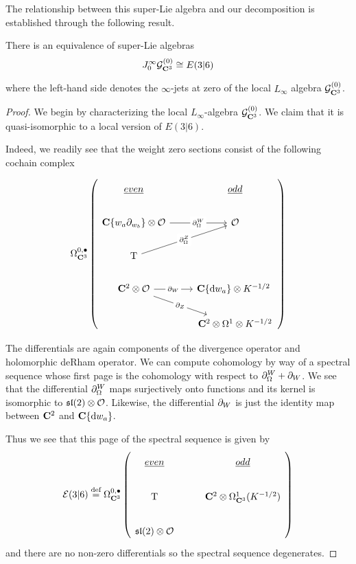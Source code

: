 \documentclass[../main.tex]{subfiles}
\begin{document}
The relationship between this super-Lie algebra and our decomposition is established through the following result.

\begin{prop}\label{prop:g0e36}
There is an equivalence of super-Lie algebras
\[
J^\infty_0\mathcal{G}^{(0)}_{\mathbf{C}^3} \cong E(3|6)
\]
\end{prop}
where the left-hand side denotes the $\infty$-jets at zero of the local $L_\infty$ algebra $\mathcal{G}^{(0)}_{\mathbf{C}^3}$. 
\begin{proof}
We begin by characterizing the local $L_\infty$-algebra $\mathcal{G}^{(0)}_{\mathbf{C}^3}$. We claim that it is quasi-isomorphic to a local version of $E(3|6)$. 

Indeed, we readily see that the weight zero sections consist of the following cochain complex

\begin{equation}
\Omega^{0,\bullet}_{\C^3} \left (
\begin{tikzcd}
\ul{even} & \ul{odd} \\
\C\{w_a\del_{w_b}\}\otimes \mc O\ar[r, "\del^W_\Omega" description]  & \mc O \\ 
\T \ar[ur, "\del^Z_\Omega" description] & \\
\C^2\otimes \mc O \ar[r, "\del_W" description]\ar[dr, "\del_Z" description] & \C\{\d w_a\} \otimes K^{-1/2}\ \\
& \C^2 \otimes \Omega^1\otimes K^{-1/2}
\end{tikzcd} \right)
\end{equation}

The differentials are again components of the divergence operator and holomorphic deRham operator. We can compute cohomology by way of a spectral sequence whose first page is the cohomology with respect to $\partial^W_\Omega + \partial_W$. We see that the differential $\partial^W_\Omega$ maps surjectively onto functions and its kernel is isomorphic to $\mathfrak{sl}(2) \otimes \mathcal{O}$. Likewise, the differential $\partial_W$ is just the identity map between $\mathbf{C}^2$ and $\mathbf{C}\{\mathrm{d} w_a\}$. 

Thus we see that this page of the spectral sequence is given by 
\begin{equation}
\mc E(3|6) \define \Omega^{0,\bullet}_{\C^3} \left (
\begin{tikzcd}
\ul{even} & \ul{odd} \\
\T & \C^2\otimes \Omega^1_{\C^3} (K^{-1/2}) \\
\mf {sl}(2)\otimes \mc O
\end{tikzcd} \right)
\end{equation}
and there are no non-zero differentials so the spectral sequence degenerates.


\end{proof}
\end{document}
